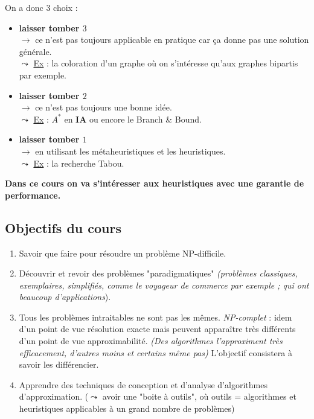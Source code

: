 \documentclass{article}
\begin{document}
\begin{sffamily}
\noindent On a donc 3 choix :
\begin{itemize}
\item \textbf{laisser tomber $3$}\\
$\rightarrow$ ce n'est pas toujours applicable en pratique car ça donne pas une solution générale.\\
$\leadsto$ \underline{Ex} : la coloration d'un graphe où on s'intéresse qu'aux graphes bipartis par exemple.
\item \textbf{laisser tomber $2$}\\
$\rightarrow$ ce n'est pas toujours une bonne idée.\\
$\leadsto$ \underline{Ex} : $A^*$ en \textbf{IA} ou encore le Branch \& Bound.
\item \textbf{laisser tomber $1$}\\
$\rightarrow$ en utilisant les métaheuristiques et les heuristiques.\\
$\leadsto$ \underline{Ex} : la recherche Tabou.\\
\end{itemize}

\textbf{Dans ce cours on va s'intéresser aux heuristiques avec une garantie de performance.}

\subsection{Objectifs du cours}

\begin{enumerate}
\item Savoir que faire pour résoudre un problème NP-difficile.
\item Découvrir et revoir des problèmes "paradigmatiques" \textit{(problèmes classiques, exemplaires, simplifiés, comme le 
voyageur de commerce par exemple ; qui ont beaucoup d'applications}).
\item Tous les problèmes intraitables ne sont pas les mêmes. \textit{NP-complet} : idem d'un point de vue résolution exacte mais 
peuvent apparaître très différents d'un point de vue approximabilité. \textit{(Des algorithmes l'approximent très efficacement, 
d'autres moins et certains même pas)} L'objectif consistera à savoir les différencier.
\item Apprendre des techniques de conception et d'analyse d'algorithmes d'approximation. ($\leadsto$ avoir une "boite à 
outils", où outils = algorithmes et heuristiques applicables à un grand nombre de problèmes)
\end{enumerate}


\end{sffamily}
\end{document}
